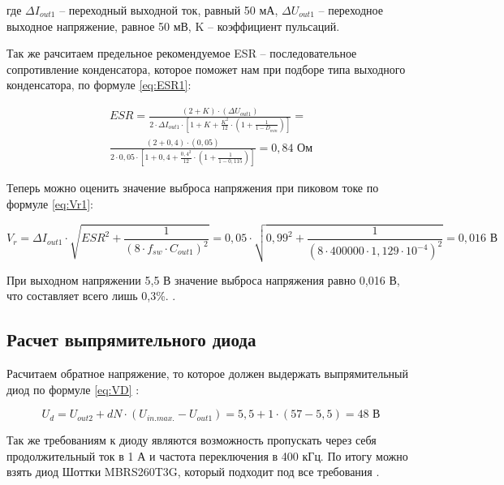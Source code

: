 где $\Delta I_{out1}$ -- переходный выходной ток, равный 50 мА, $\Delta U_{out1}$ -- переходное выходное 
напряжение, равное 50 мВ,
K -- коэффициент пульсаций. 

Так же рачситаем предельное рекомендуемое ESR -- последовательное сопротивление конденсатора, которое поможет 
нам при подборе типа выходного конденсатора, по формуле \ref{eq:ESR1}:

\begin{eqnarray}
    ESR = \frac{(2 + K) \cdot (\Delta U_{out1})}{2 \cdot \Delta I_{out1} \cdot 
    [1 + K + \frac{K^{2}}{12} \cdot (1 + \frac{1}{1 - D_{min}})]} = \nonumber\\
    \frac{(2 + 0,4) \cdot (0,05)}{2 \cdot 0,05 \cdot 
    [1 + 0,4 + \frac{0,4^{2}}{12} \cdot (1 + \frac{1}{1 - 0,115})]} =
    0,84 \text{ Ом}
    \label{eq:ESR1}
\end{eqnarray}

Теперь можно оценить значение выброса напряжения при пиковом токе по формуле \ref{eq:Vr1}:

\begin{equation}
    V_{r} = \Delta I_{out1} \cdot \sqrt{ESR^{2} + \frac{1}{(8 \cdot f_{sw} \cdot C_{out1})^{2}}} =
    0,05 \cdot \sqrt{0,99^{2} + \frac{1}{(8 \cdot 400000 \cdot 1,129 \cdot 10^{-4})^{2}}} =
    0,016 \text{ В}
    \label{eq:Vr1}
\end{equation}

При выходном напряжении 5,5 В значение выброса напряжения равно 0,016 В, что составляет всего лишь 0,3\%. 
\cite{LMR36520:Aplication Note}.

\subsection{Расчет выпрямительного диода}
\hspace{1cm} 

Расчитаем обратное напряжение, то которое должен выдержать выпрямительный диод по формуле \ref{eq:VD} 
\cite{LMR36520:Aplication Note}:

\begin{equation}
    U_{d} = U_{out2} + dN \cdot (U_{in. max.} - U_{out1}) =
     5,5 + 1 \cdot (57 - 5,5) = 48 \text{ В}
    \label{eq:VD}
\end{equation}

Так же требованиям к диоду являются возможность пропускать через себя продолжительный ток в 1 А и частота
переключения в 400 кГц. По итогу можно взять диод Шоттки MBRS260T3G, который подходит под все требования 
\cite{MBRS260T3G:datasheet}.

